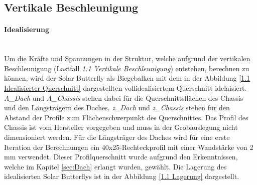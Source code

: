 \subsection{Vertikale Beschleunigung}
\label{1.1 Vertikale Beschleunigung}
  \paragraph{Idealisierung}\mbox{}\\
  Um die Kräfte und Spannungen in der Struktur, welche aufgrund der vertikalen Beschleunigung (Lastfall \emph{1.1 Vertikale Beschleunigung}) entstehen, berechnen zu können, wird der Solar Butterfly als Biegebalken mit dem in der Abbildung \ref{1.1 Idealisierter Querschnitt} dargestellten vollidealisiertem Querschnitt idelaisiert. \emph{A\_Dach} und \emph{A\_Chassis} stehen dabei für die Querschnittsflächen des Chassis und den Längsträgern des Daches. \emph{z\_Dach} und \emph{z\_Chassis} stehen für den Abstand der Profile zum Flächenschwerpunkt des Querschnittes. Das Profil des Chassis ist vom Hersteller vorgegeben und muss in der Grobauslegung nicht dimensioniert werden. Für die Längsträger des Daches wird für eine erste Iteration der Berechnungen ein 40x25-Rechteckprofil mit einer Wandstärke von 2 mm verwendet. Dieser Profilquerschnitt wurde aufgrund den Erkenntnissen, welche im Kapitel \ref{sec:Dach} erlangt wurden, gewählt. Die Lagerung des idealisierten Solar Butterflys ist in der Abbildung \ref{1.1 Lagerung} dargestellt.

